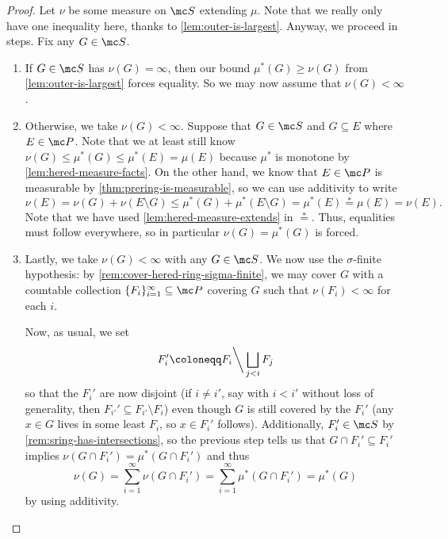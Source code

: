 \documentclass[../notes.tex]{subfiles}
\begin{document}
\begin{proof}
	Let $\nu$ be some measure on $\mc S$ extending $\mu$. Note that we really only have one inequality here, thanks to \autoref{lem:outer-is-largest}. Anyway, we proceed in steps. Fix any $G\in\mc S$.
	\begin{enumerate}
		\item If $G\in\mc S$ has $\nu(G)=\infty$, then our bound $\mu^*(G)\ge\nu(G)$ from \autoref{lem:outer-is-largest} forces equality. So we may now assume that $\nu(G)<\infty$.
		\item Otherwise, we take $\nu(G)<\infty$. Suppose that $G\in\mc S$ and $G\subseteq E$ where $E\in\mc P$. Note that we at least still know $\nu(G)\le\mu^*(G)\le\mu^*(E)=\mu(E)$ because $\mu^*$ is monotone by \autoref{lem:hered-measure-facts}. On the other hand, we know that $E\in\mc P$ is measurable by \autoref{thm:prering-is-measurable}, so we can use additivity to write
		\[\nu(E)=\nu(G)+\nu(E\setminus G)\le\mu^*(G)+\mu^*(E\setminus G)=\mu^*(E)\stackrel*=\mu(E)=\nu(E).\]
		Note that we have used \autoref{lem:hered-measure-extends} in $\stackrel*=$. Thus, equalities must follow everywhere, so in particular $\nu(G)=\mu^*(G)$ is forced.
		\item Lastly, we take $\nu(G)<\infty$ with any $G\in\mc S$. We now use the $\sigma$-finite hypothesis: by \autoref{rem:cover-hered-ring-sigma-finite}, we may cover $G$ with a countable collection $\{F_i\}_{i=1}^\infty\subseteq\mc P$ covering $G$ such that $\nu(F_i)<\infty$ for each $i$.

		Now, as usual, we set
		\[F_i'\coloneqq F_i{\mathbin\bigg\backslash}\bigsqcup_{j<i}F_j\]
		so that the $F_i'$ are now disjoint (if $i\ne i'$, say with $i<i'$ without loss of generality, then $F_{i'}'\subseteq F_{i'}\setminus F_i$) even though $G$ is still covered by the $F_i'$ (any $x\in G$ lives in some least $F_i$, so $x\in F_i'$ follows). Additionally, $F_i'\in\mc S$ by \autoref{rem:sring-has-intersections}, so the previous step tells us that $G\cap F_i'\subseteq F_i'$ implies $\nu(G\cap F_i')=\mu^*(G\cap F_i')$ and thus
		\[\nu(G)=\sum_{i=1}^\infty\nu(G\cap F_i')=\sum_{i=1}^\infty\mu^*(G\cap F_i')=\mu^*(G)\]
		by using additivity.
		\qedhere
	\end{enumerate}
\end{proof}
\end{document}
